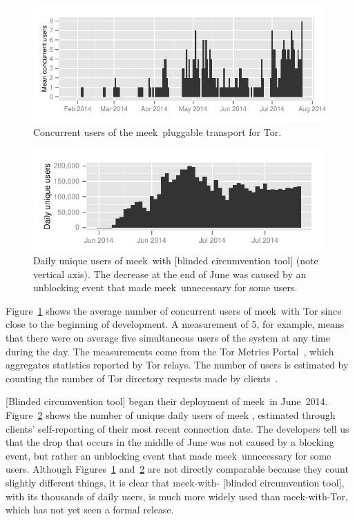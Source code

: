 \documentclass[conference]{IEEEtran}
\newcommand{\meek}{meek\xspace}
\begin{document}
\begin{figure}
\includegraphics[width=\linewidth]{clients-meek}
\caption{
Concurrent users of the \meek\ pluggable transport for Tor.
}
\label{fig:clients-tor}
\end{figure}

\begin{figure}
\includegraphics[width=\linewidth]{clients-psiphon3}
\caption{
Daily unique users of \meek\ with
[blinded circumvention tool]
(note vertical axis).
The decrease at the end of June
was caused by an unblocking event that made \meek\ unnecessary for some users.
}
\label{fig:clients-psiphon3}
\end{figure}

Figure~\ref{fig:clients-tor} shows the average number of concurrent users of \meek\ with Tor
since close to the beginning of development.
A measurement of 5, for example, means that there were on average five
simultaneous users of the system at any time during the day.
The measurements come from the Tor Metrics Portal~\cite{metrics-meek},
which aggregates statistics reported by Tor relays.
The number of users is estimated by counting the number
of Tor directory requests made by clients~\cite{counting-daily-bridge-users}.

[Blinded circumvention tool]
began their deployment of \meek\ in June~2014.
Figure~\ref{fig:clients-psiphon3} shows the number
of unique daily users of \meek%
,
estimated through clients' self-reporting of their most recent connection date.
The developers tell us that the drop that occurs
in the middle of June was not caused by a blocking event,
but rather an unblocking event that made \meek\ unnecessary for some users.
Although Figures~\ref{fig:clients-tor} and~\ref{fig:clients-psiphon3}
are not directly comparable because they count slightly different things,
it is clear that meek-with-%
[blinded circumvention tool],
with its thousands of daily users,
is much more widely used than meek-with-Tor, which has not yet seen a formal release.
\end{document}
